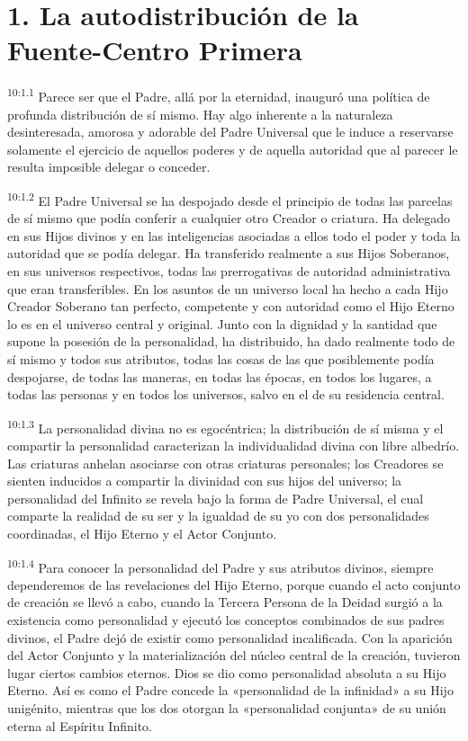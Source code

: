 \section*{1. La autodistribución de la Fuente-Centro Primera}
\par
\textsuperscript{10:1.1} Parece ser que el Padre, allá por la eternidad, inauguró una política de profunda distribución de sí mismo. Hay algo inherente a la naturaleza desinteresada, amorosa y adorable del Padre Universal que le induce a reservarse solamente el ejercicio de aquellos poderes y de aquella autoridad que al parecer le resulta imposible delegar o conceder.

\par
\textsuperscript{10:1.2} El Padre Universal se ha despojado desde el principio de todas las parcelas de sí mismo que podía conferir a cualquier otro Creador o criatura. Ha delegado en sus Hijos divinos y en las inteligencias asociadas a ellos todo el poder y toda la autoridad que se podía delegar. Ha transferido realmente a sus Hijos Soberanos, en sus universos respectivos, todas las prerrogativas de autoridad administrativa que eran transferibles. En los asuntos de un universo local ha hecho a cada Hijo Creador Soberano tan perfecto, competente y con autoridad como el Hijo Eterno lo es en el universo central y original. Junto con la dignidad y la santidad que supone la posesión de la personalidad, ha distribuido, ha dado realmente todo de sí mismo y todos sus atributos, todas las cosas de las que posiblemente podía despojarse, de todas las maneras, en todas las épocas, en todos los lugares, a todas las personas y en todos los universos, salvo en el de su residencia central.

\par
\textsuperscript{10:1.3} La personalidad divina no es egocéntrica; la distribución de sí misma y el compartir la personalidad caracterizan la individualidad divina con libre albedrío. Las criaturas anhelan asociarse con otras criaturas personales; los Creadores se sienten inducidos a compartir la divinidad con sus hijos del universo; la personalidad del Infinito se revela bajo la forma de Padre Universal, el cual comparte la realidad de su ser y la igualdad de su yo con dos personalidades coordinadas, el Hijo Eterno y el Actor Conjunto.

\par
\textsuperscript{10:1.4} Para conocer la personalidad del Padre y sus atributos divinos, siempre dependeremos de las revelaciones del Hijo Eterno, porque cuando el acto conjunto de creación se llevó a cabo, cuando la Tercera Persona de la Deidad surgió a la existencia como personalidad y ejecutó los conceptos combinados de sus padres divinos, el Padre dejó de existir como personalidad incalificada. Con la aparición del Actor Conjunto y la materialización del núcleo central de la creación, tuvieron lugar ciertos cambios eternos. Dios se dio como personalidad absoluta a su Hijo Eterno. Así es como el Padre concede la «personalidad de la infinidad» a su Hijo unigénito, mientras que los dos otorgan la «personalidad conjunta» de su unión eterna al Espíritu Infinito.

